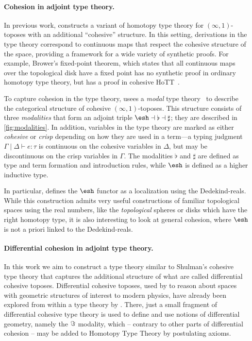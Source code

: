 \documentclass{article}
\begin{document}
\paragraph{Cohesion in adjoint type theory.}

In previous work, \citet{Shulman2015} constructs a variant of homotopy type
theory for $(\infty,1)$-toposes with an additional ``cohesive'' structure. In
this setting, derivations in the type theory correspond to continuous maps that
respect the cohesive structure of the space, providing a framework for a wide
variety of synthetic proofs. For example, Brower's fixed-point theorem, which
states that all continuous maps over the topological disk have a fixed point has
no synthetic proof in ordinary homotopy type theory, but has a proof in cohesive
HoTT~\citep{Shulman2015}.


To capture cohesion in the type theory, \citet{Shulman2015} usees a \emph{modal}
type theory~\citep{Pfenning2001} to describe the categorical structure of
cohesive $(\infty,1)$-toposes. This structure consists of three
\emph{modalities}  that form an adjoint triple
$\shape \dashv \flat \dashv \sharp$; they are described in
\cref{fig:modalities}. In addition, variables in the type theory are marked as
either \emph{cohesive} or \emph{crisp} depending on how they are used in a
term---a typing judgment $\Gamma \mid \Delta \vdash e : \tau$ is continuous on
the cohesive variables in $\Delta$, but may be discontinuous on the crisp
variables in $\Gamma$. The modalities $\flat$ and $\sharp$ are defined as type
and term formation and introduction rules, while $\shape$ is defined as a higher
inductive type.


In particular, \citeauthor{Shulman2015} defines the $\shape$ functor as a
localization using the Dedekind-reals. While this construction admits very
useful constructions of familiar topological spaces using the real numbers, like
the \emph{topological} spheres or disks which have the right homotopy type, it
is also interesting to look at general cohesion, where $\shape$ is not a priori
linked to the Dedekind-reals.


\paragraph{Differential cohesion in adjoint type theory.}

In this work we aim to construct a type theory similar to Shulman's cohesive
type theory that captures the additional structure of what are called
differential cohesive toposes.  Differential cohesive toposes, used by \citet{Schreiber2013}
to reason about spaces with geometric structures of interest to modern physics,
have already been explored from within a type theory by \citet{Wellen2017}.
There, just a small fragment of differential cohesive type theory is used to
define and use notions of differential geometry, namely the $\Im$ modality,
which -- contrary to other parts of differential cohesion -- may be added to
Homotopy Type Theory by postulating axioms.
\end{document}
